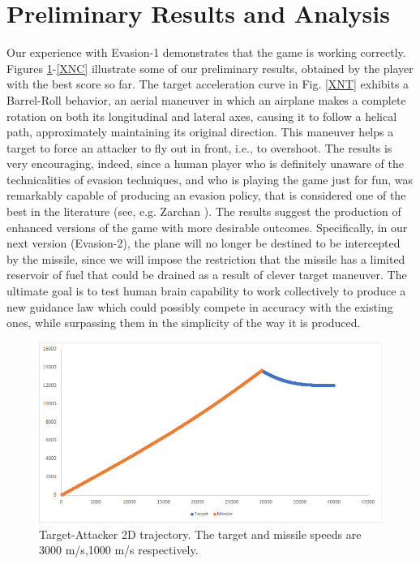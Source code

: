  
\section{Preliminary ٌٌResults and Analysis}	

Our experience with Evasion-1 demonstrates that the game is working correctly. Figures \ref{trajectory}-\ref{XNC} illustrate some of our preliminary results, obtained by the player with the best score so far. The target acceleration curve in Fig. \ref{XNT} exhibits a Barrel-Roll behavior, an aerial maneuver in which an airplane makes a complete rotation on both its longitudinal and lateral axes, causing it to follow a helical path, approximately maintaining its original direction. This maneuver helps a target to force an attacker to fly out in front, i.e., to overshoot. The results is very encouraging, indeed, since a human player who is definitely unaware of the technicalities of evasion techniques, and who is playing the game just for fun, was remarkably capable of producing an evasion policy, that is considered one of the best in the literature (see, e.g. Zarchan ). The results suggest the production of enhanced versions of the game with more desirable outcomes. Specifically, in our next version (Evasion-2), the plane will no longer be destined to be intercepted by the missile, since we will impose the restriction that the missile has a limited reservoir of fuel that could be drained as a result of clever target maneuver. The ultimate goal is to test human brain capability to work collectively to produce a new guidance law which could possibly compete in accuracy with the existing ones, while surpassing them in the simplicity of the way it is produced. 

 \begin{figure}[H]
	\centering
	\includegraphics[scale = 0.70]{fig/trajectory.PNG}
	\caption{Target-Attacker 2D trajectory. The target and missile speeds are 3000 m/s,1000 m/s respectively.}
	\label{trajectory}
\end{figure}

